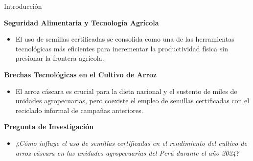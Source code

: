 \documentclass[t]{beamer}
\begin{document}
\begin{frame}[t]{Introducción}
\hspace{0.2cm}
\begin{minipage}{0.92\textwidth}
\vspace{-0.4cm}
    \textbf{Seguridad Alimentaria y Tecnología Agrícola}
    \vspace{0.05cm}
        \begin{itemize}
            \justifying
            \item El uso de semillas certificadas se consolida como una de las herramientas tecnológicas más eficientes para incrementar la productividad física sin presionar la frontera agrícola.
        \end{itemize}
        
    \vspace{0.05cm}
    \normalsize
    \textbf{Brechas Tecnológicas en el Cultivo de Arroz}
        \begin{itemize}
            \justifying
            \item El arroz cáscara es crucial para la dieta nacional y el sustento de miles de unidades agropecuarias, pero coexiste el empleo de semillas certificadas con el reciclado informal de campañas anteriores.
        \end{itemize}
    
    \vspace{0.05cm}
    \normalsize
    \textbf{Pregunta de Investigación}
        \begin{itemize}
            \justifying
            \item \textit{¿Cómo influye el uso de semillas certificadas en el rendimiento del cultivo de arroz cáscara en las unidades agropecuarias del Perú durante el año 2024?}
        \end{itemize}
        
\end{minipage}
\end{frame}
\end{document}
